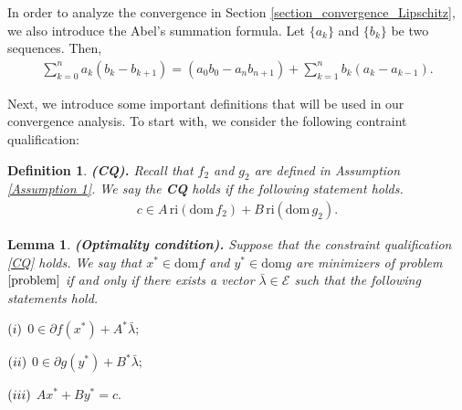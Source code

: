 \documentclass{article}
\numberwithin{equation}{section}
\newtheorem{lemma}{Lemma}[section]
\newtheorem{definition}{Definition}[section]
\begin{document}
In order to analyze the convergence in Section \ref{section_convergence_Lipschitz}, we also introduce the Abel's summation formula. Let
$\{a_k\}$ and $\{b_k\}$ be two sequences. Then, 
\begin{align}
    \sum\limits_{k=0}^n a_k(b_k - b_{k+1}) = (a_0b_0 - a_{n}b_{n+1})+ \sum\limits_{k=1}^{n} b_{k}(a_{k}-a_{k-1}). 
    \label{Abel formula}
\end{align}

Next, we introduce some important definitions that will be used in our convergence analysis. To start with, 
we consider the following contraint qualification: 
\begin{definition}
    {\rm{\textbf{(CQ).}}} Recall that $f_2$ and $g_2$ are defined in Assumption \ref{Assumption 1}. 
    We say the \textbf{CQ} holds if the following statement holds. 
    \begin{align}
        c \in A\hspace{2pt} \mathrm{ri}\left(\mathrm{dom}\hspace{2pt}f_2\right) +
    B\hspace{2pt} \mathrm{ri}\left(\mathrm{dom}\hspace{2pt}g_2\right).  \label{CQ} 
    \end{align}
\end{definition}
\begin{lemma}
    {\rm{\textbf{(Optimality condition).}}} \label{optimal}
    Suppose that the constraint qualification \eqref{CQ} holds. 
    We say that $x^*\in \mathrm{dom}f$ and $y^*\in \mathrm{dom}g$ are minimizers of problem $\eqref{problem}$ 
    if and only if there exists a vector $\bar{\lambda} \in \mathcal{E}$ such that the following statements hold.
    
    $(\romannumeral1)$ $0 \in \partial f(x^*) + A^*\bar{\lambda};  $

    $(\romannumeral2)$ $0 \in \partial g(y^*) + B^*\bar{\lambda};  $

    $(\romannumeral3)$ $Ax^* + By^* =c. $
    
\end{lemma}
\end{document}
